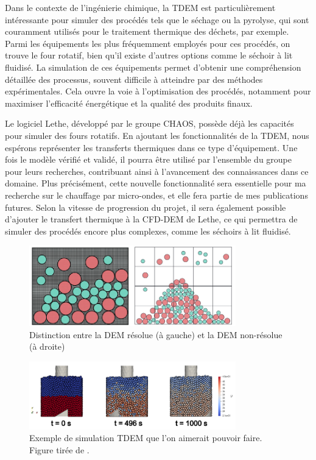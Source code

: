 \documentclass[12pt]{article}
\newcounter{publications}[section]\setcounter{publications}{0}
\begin{document}
Dans le contexte de l'ingénierie chimique, la TDEM est particulièrement intéressante pour simuler des procédés tels que le séchage ou la pyrolyse, qui sont couramment utilisés pour le traitement thermique des déchets, par exemple. Parmi les équipements les plus fréquemment employés pour ces procédés, on trouve le four rotatif, bien qu'il existe d'autres options comme le séchoir à lit fluidisé. La simulation de ces équipements permet d'obtenir une compréhension détaillée des processus, souvent difficile à atteindre par des méthodes expérimentales. Cela ouvre la voie à l'optimisation des procédés, notamment pour maximiser l'efficacité énergétique et la qualité des produits finaux.

Le logiciel Lethe, développé par le groupe CHAOS, possède déjà les capacités pour simuler des fours rotatifs. En ajoutant les fonctionnalités de la TDEM, nous espérons représenter les transferts thermiques dans ce type d'équipement. Une fois le modèle vérifié et validé, il pourra être utilisé par l'ensemble du groupe pour leurs recherches, contribuant ainsi à l'avancement des connaissances dans ce domaine. Plus précisément, cette nouvelle fonctionnalité sera essentielle pour ma recherche sur le chauffage par micro-ondes, et elle fera partie de mes publications futures. Selon la vitesse de progression du projet, il sera également possible d'ajouter le transfert thermique à la CFD-DEM de Lethe, ce qui permettra de simuler des procédés encore plus complexes, comme les séchoirs à lit fluidisé.

\begin{figure}[h]
  \centering
  \includegraphics[width=0.8\textwidth]{DEM.png}
  \caption{Distinction entre la DEM résolue (à gauche) et la DEM non-résolue (à droite)}
  \label{fig:DEM}
\end{figure}

\begin{figure}[!h]
  \centering
  \includegraphics[width=0.8\textwidth]{TDEM.png}
  \caption{Exemple de simulation TDEM que l'on aimerait pouvoir faire. Figure tirée de \cite{fischer_particle-particle_2023}.}
  \label{fig:TDEM}
\end{figure}
\end{document}
